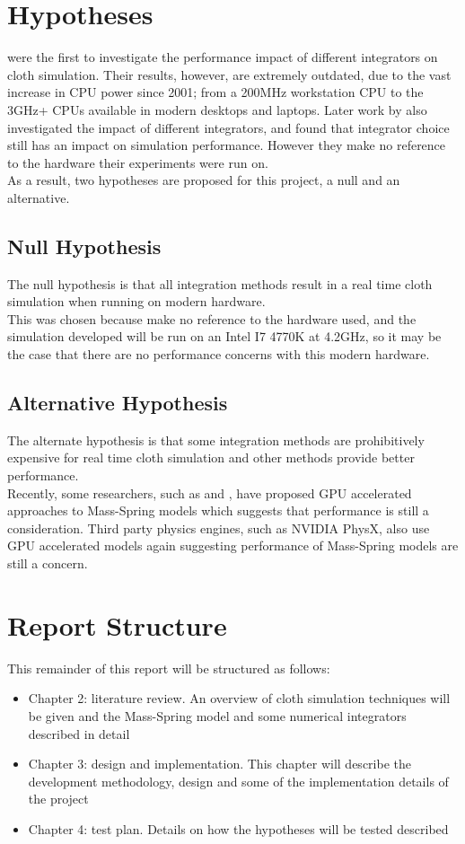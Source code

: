 \section{Hypotheses}
\textcite{Volino2001} were the first to investigate the performance impact of different integrators on cloth simulation. Their results, however, are extremely outdated, due to the vast increase in CPU power since 2001; from a 200MHz workstation CPU to the 3GHz+ CPUs available in modern desktops and laptops. Later work by \textcite{Wang2009a} also investigated the impact of different integrators, and found that integrator choice still has an impact on simulation performance. However they make no reference to the hardware their experiments were run on.
\\As a result, two hypotheses are proposed for this project, a null and an alternative.

\subsection{Null Hypothesis}
The null hypothesis is that all integration methods result in a real time cloth simulation when running on modern hardware.
\\This was chosen because \textcite{Wang2009a} make no reference to the hardware used, and the simulation developed will be run on an Intel I7 4770K at 4.2GHz, so it may be the case that there are no performance concerns with this modern hardware.

\subsection{Alternative Hypothesis}
The alternate hypothesis is that some integration methods are prohibitively expensive for real time cloth simulation and other methods provide better performance.
\\Recently, some researchers, such as \textcite{Zeller2005} and \textcite{Tang2013}, have proposed GPU accelerated approaches to Mass-Spring models which suggests that performance is still a consideration. Third party physics engines, such as NVIDIA \textsuperscript{\textregistered} PhysX\textsuperscript{\textregistered}, also use GPU accelerated models \parencite{Kim2011} again suggesting performance of Mass-Spring models are still a concern.

\section{Report Structure}
This remainder of this report will be structured as follows:
\begin{itemize}
  \item{Chapter 2: literature review. An overview of cloth simulation techniques will be given and the Mass-Spring model and some numerical integrators described in detail}
  \item{Chapter 3: design and implementation. This chapter will describe the development methodology, design and some of the implementation details of the project}
  \item{Chapter 4: test plan. Details on how the hypotheses will be tested described}
\end{itemize}
